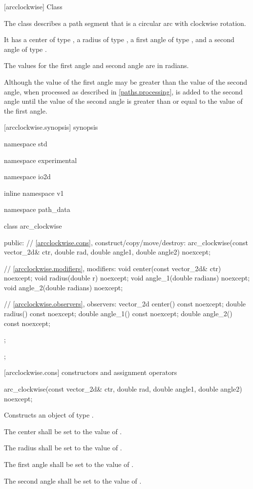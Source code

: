  [arcclockwise] {Class }

\pnum
{}
The class  describes a path segment that is a circular arc with clockwise rotation.

\pnum
It has a center of type , a radius of type , a first angle of type , and a second angle of type .

\pnum
The values for the first angle and second angle are in radians.

\pnum
\enternote
Although the value of the first angle may be greater than the value of the second angle, when processed as described in \ref{paths.processing},  is added to the second angle until the value of the second angle is greater than or equal to the value of the first angle.
\exitnote

 [arcclockwise.synopsis] { synopsis}

\begin{codeblock}
namespace std { namespace experimental { namespace io2d { inline namespace v1 {
  namespace path_data {
    class arc_clockwise {
    public:
      // \ref{arcclockwise.cons}, construct/copy/move/destroy:
      arc_clockwise(const vector_2d& ctr, double rad, double angle1,
        double angle2) noexcept;

      // \ref{arcclockwise.modifiers}, modifiers:
      void center(const vector_2d& ctr) noexcept;
      void radius(double r) noexcept;
      void angle_1(double radians) noexcept;
      void angle_2(double radians) noexcept;

      // \ref{arcclockwise.observers}, observers:
      vector_2d center() const noexcept;
      double radius() const noexcept;
      double angle_1() const noexcept;
      double angle_2() const noexcept;
    };
  };
} } } }
\end{codeblock}

 [arcclockwise.cons] { constructors and assignment operators}

\begin{itemdecl}
    arc_clockwise(const vector_2d& ctr, double rad, double angle1,
      double angle2) noexcept;
\end{itemdecl}
\begin{itemdescr}
	\pnum
	\effects
	Constructs an object of type .
	
	\pnum
	The center shall be set to the value of .
	
	\pnum
	The radius shall be set to the value of .
	
	\pnum
	The first angle shall be set to the value of .
	
	\pnum
	The second angle shall be set to the value of .
\end{itemdescr}

